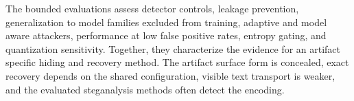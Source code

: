 \documentclass[fleqn,10pt]{wlscirep}
\begin{document}
The bounded evaluations assess detector controls, leakage prevention, generalization to model families excluded from training, adaptive and model aware attackers, performance at low false positive rates, entropy gating, and quantization sensitivity. Together, they characterize the evidence for an artifact specific hiding and recovery method. The artifact surface form is concealed, exact recovery depends on the shared configuration, visible text transport is weaker, and the evaluated steganalysis methods often detect the encoding.










\end{document}
